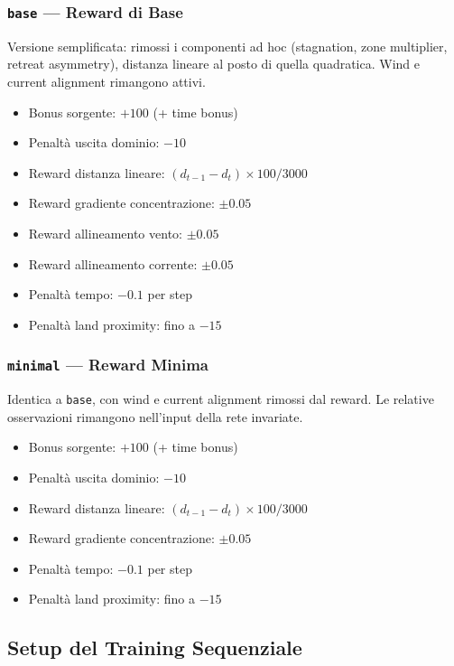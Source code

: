 \documentclass[12pt, a4paper]{article}
\begin{document}
\subsubsection*{\texttt{base} --- Reward di Base}

Versione semplificata: rimossi i componenti ad hoc (stagnation, zone multiplier,
retreat asymmetry), distanza lineare al posto di quella quadratica.
Wind e current alignment rimangono attivi.

\begin{itemize}
    \item Bonus sorgente: $+100$ (+ time bonus)
    \item Penalt\`a uscita dominio: $-10$
    \item Reward distanza lineare: $(d_{t-1} - d_t) \times 100 / 3000$
    \item Reward gradiente concentrazione: $\pm 0.05$
    \item Reward allineamento vento: $\pm 0.05$
    \item Reward allineamento corrente: $\pm 0.05$
    \item Penalt\`a tempo: $-0.1$ per step
    \item Penalt\`a land proximity: fino a $-15$
\end{itemize}

\subsubsection*{\texttt{minimal} --- Reward Minima}

Identica a \texttt{base}, con wind e current alignment rimossi dal reward.
Le relative osservazioni rimangono nell'input della rete invariate.

\begin{itemize}
    \item Bonus sorgente: $+100$ (+ time bonus)
    \item Penalt\`a uscita dominio: $-10$
    \item Reward distanza lineare: $(d_{t-1} - d_t) \times 100 / 3000$
    \item Reward gradiente concentrazione: $\pm 0.05$
    \item Penalt\`a tempo: $-0.1$ per step
    \item Penalt\`a land proximity: fino a $-15$
\end{itemize}

\subsection{Setup del Training Sequenziale}
\end{document}
